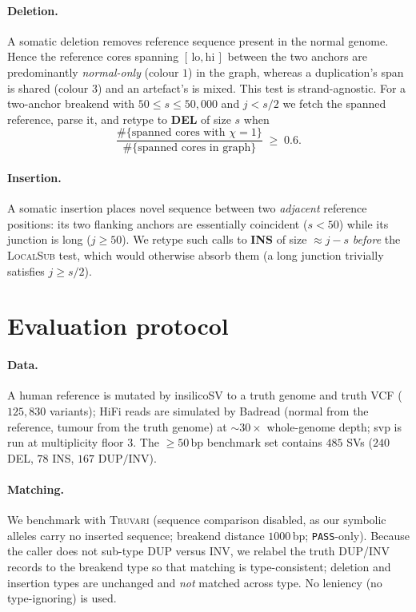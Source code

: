 \documentclass[11pt]{article}
\newcommand{\colour}{\chi}
\begin{document}
\paragraph{Deletion.}
A somatic deletion removes reference sequence present in the normal genome. Hence the reference
cores spanning $[\,\text{lo},\text{hi}\,]$ between the two anchors are predominantly
\emph{normal-only} (colour $1$) in the graph, whereas a duplication's span is shared (colour $3$)
and an artefact's is mixed. This test is strand-agnostic. For a two-anchor breakend with
$50 \le s \le 50{,}000$ and $j < s/2$ we fetch the spanned reference, parse it, and retype to
\textbf{DEL} of size $s$ when
\begin{equation}
\frac{\#\{\text{spanned cores with } \colour = 1\}}{\#\{\text{spanned cores in graph}\}} \;\ge\; 0.6 .
\end{equation}

\paragraph{Insertion.}
A somatic insertion places novel sequence between two \emph{adjacent} reference positions: its two
flanking anchors are essentially coincident ($s < 50$) while its junction is long
($j \ge 50$). We retype such calls to \textbf{INS} of size $\approx j - s$ \emph{before} the
\textsc{LocalSub} test, which would otherwise absorb them (a long junction trivially satisfies
$j \ge s/2$).

\section{Evaluation protocol}
\label{sec:eval}

\paragraph{Data.}
A human reference is mutated by insilicoSV to a truth genome and truth VCF ($125{,}830$ variants);
HiFi reads are simulated by Badread (normal from the reference, tumour from the truth genome) at
$\sim\!30\times$ whole-genome depth; svp is run at multiplicity floor $3$. The
$\geq 50$\,bp benchmark set contains $485$ SVs ($240$ DEL, $78$ INS, $167$ DUP$/$INV).

\paragraph{Matching.}
We benchmark with \textsc{Truvari} (sequence comparison disabled, as our symbolic alleles carry no
inserted sequence; breakend distance $1000$\,bp; \texttt{PASS}-only). Because the caller does not
sub-type DUP versus INV, we relabel the truth DUP/INV records to the breakend type so that
matching is type-consistent; deletion and insertion types are unchanged and \emph{not} matched
across type. No leniency (no type-ignoring) is used.
\end{document}
